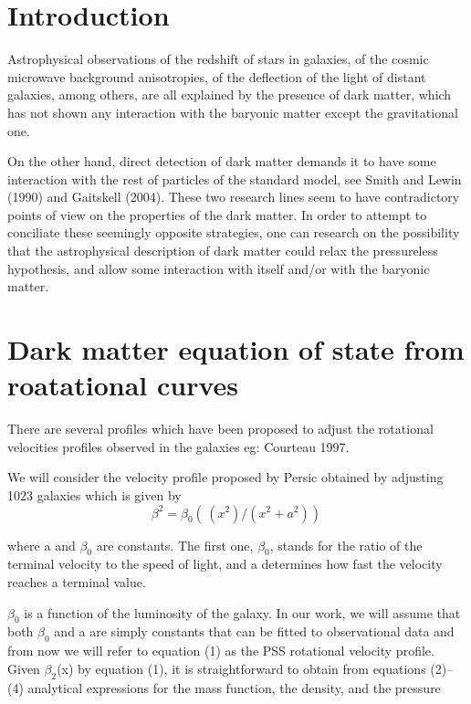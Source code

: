 \section{Introduction}
Astrophysical observations of the redshift of stars in galaxies, of the cosmic microwave background anisotropies, of the deflection of the light of distant galaxies, among others, are all explained by the presence of dark matter, which has not shown any interaction with the baryonic matter except the gravitational one.

On the other hand, direct detection of dark matter demands it to have some interaction with the rest of particles of the standard model, see Smith and Lewin (1990) and Gaitskell (2004). These two research lines seem to have contradictory points of view on the properties of the dark matter. In order to attempt to conciliate these seemingly opposite strategies, one can research on the possibility that the astrophysical description of dark matter could relax the pressureless hypothesis, and allow some interaction with itself and/or with the baryonic matter.

\section{Dark matter equation of state from roatational curves}

There are several profiles which have been proposed to adjust the rotational velocities profiles observed in the galaxies eg: Courteau 1997.

We will consider the velocity profile proposed by Persic  obtained by adjusting 1023 galaxies which is given by
\begin{equation}
	\beta^2 =\beta_0(\,(x^2)/(x^2+a^2))\,
\end{equation}$$$$

where a and $\beta_0$ are constants. The first one, $\beta_0$, stands for the ratio of the terminal velocity to the speed of light, and a determines how fast the velocity reaches a terminal value. 

$\beta_0$ is a function of the luminosity of the galaxy. In our work, we will assume that both $\beta_0$ and a are simply constants that can be fitted to observational data and from now we will refer to equation (1) as the PSS rotational velocity profile.
Given $\beta_2$(x) by equation (1), it is straightforward to obtain from equations (2)–(4) analytical expressions for the mass function, the density, and the pressure

